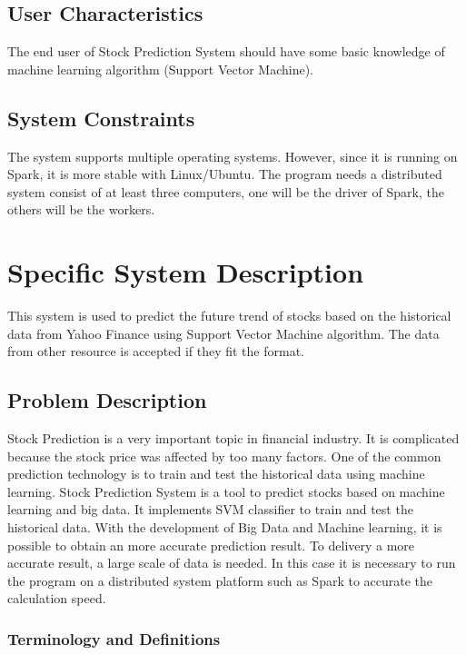 \documentclass[12pt]{article}
\newcommand{\progname}{Stock Prediction System} %
\begin{document}
\subsection{User Characteristics} \label{SecUserCharacteristics}

The end user of \progname{} should have some basic knowledge of machine learning algorithm (Support Vector Machine).

\subsection{System Constraints}

The system supports multiple operating systems. However, since it is running on
Spark, it is more stable with Linux/Ubuntu. The program needs a distributed
system consist of at least three computers, one will be the driver of Spark,
the others will be the workers.

\section{Specific System Description}

This system is used to predict the future trend of stocks based on the
historical data from Yahoo Finance using Support Vector Machine algorithm. The
data from other resource is accepted if they fit the
format.

\subsection{Problem Description} \label{Sec_pd}

Stock Prediction is a very important topic in financial industry. It is
complicated because the stock price was affected by too many factors. One of the
common prediction technology is to train and test the historical data using
machine learning. \progname{} is a tool to predict stocks
based on machine learning and big data. It implements SVM classifier to train
and test the historical data. With the development of Big Data and Machine
learning, it is possible to obtain an more accurate prediction result. To
delivery a more accurate result, a large scale of data is needed. In this case
it is necessary to run the program on a distributed system
platform such as Spark to accurate the calculation speed.


\subsubsection{Terminology and Definitions}
\end{document}

